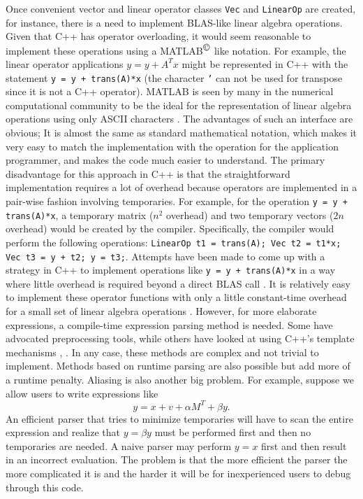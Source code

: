 \documentclass[acmtoms,acmnow]{acmtrans2m}
\begin{document}
Once convenient vector and linear operator classes {}\texttt{Vec} and
{}\texttt{LinearOp} are created, for instance, there is a need to
implement BLAS-like linear algebra operations.  Given that C++ has
operator overloading, it would seem reasonable to implement these
operations using a MATLAB${}^{\mbox{\copyright}}$ like notation.  For
example, the linear operator applications $y = y + A^T x$ might be
represented in C++ with the statement {}\texttt{y = y + trans(A)*x}
(the character {}\texttt{'} can not be used for transpose since it is
not a C++ operator).  MATLAB is seen by many in the numerical
computational community to be the ideal for the representation of
linear algebra operations using only ASCII characters
{}\cite{ref:demmel_1997}.  The advantages of such an interface are
obvious; It is almost the same as standard mathematical notation,
which makes it very easy to match the implementation with the
operation for the application programmer, and makes the code much
easier to understand.  The primary disadvantage for this approach in
C++ is that the straightforward implementation requires a lot of
overhead because operators are implemented in a pair-wise fashion
involving temporaries.  For example, for the operation {}\texttt{y = y
+ trans(A)*x}, a temporary matrix ($n^2$ overhead) and two temporary
vectors ($2n$ overhead) would be created by the compiler.
Specifically, the compiler would perform the following operations:
{}\texttt{LinearOp t1 = trans(A); Vec t2 = t1*x; Vec t3 = y + t2; y =
t3;}.  Attempts have been made to come up with a strategy in C++ to
implement operations like {}\texttt{y = y + trans(A)*x} in a way where
little overhead is required beyond a direct BLAS call
{}\cite{ref:parker_1997}.  It is relatively easy to implement these
operator functions with only a little constant-time overhead for a
small set of linear algebra operations {}\cite[pages
675-677]{ref:stroustrup_1997}.  However, for more elaborate
expressions, a compile-time expression parsing method is needed.  Some
have advocated preprocessing tools, while others have looked at using
C++'s template mechanisms {}\cite{ref:veldhuizen_et_al_1998},
{}\cite{ref:parker_1997}.  In any case, these methods are complex and
not trivial to implement.  Methods based on runtime parsing are also
possible but add more of a runtime penalty.  Aliasing is also another
big problem.  For example, suppose we allow users to write expressions
like
%
\[
y = x + v + \alpha M^{T} + \beta y.
\]
%
An efficient parser that tries to minimize temporaries will have to scan the
entire expression and realize that $y = \beta y$ must be performed first and
then no temporaries are needed.  A naive parser may perform $y = x$ first and
then result in an incorrect evaluation.  The problem is that the more
efficient the parser the more complicated it is and the harder it will be for
inexperienced users to debug through this code.
\end{document}
